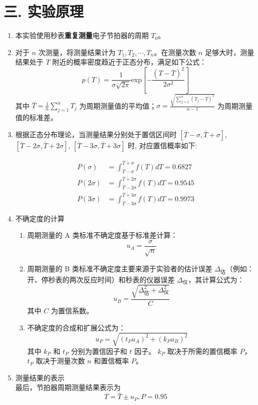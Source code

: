 \documentclass[12pt,a4paper]{article}
\begin{document}
	\section*{\textbf{{三. 实验原理}}}
	\begin{enumerate}
		\item 本实验使用秒表\textbf{重复测量}电子节拍器的周期 $T_0$。
		\item 对于 $n$ 次测量，将测量结果计为 $T_1,T_2,\cdots,T_n$。在测量次数 $n$ 足够大时，测量结果处于 $T$ 附近的概率密度趋近于正态分布，满足如下公式：
		$$p(T)=\dfrac{1}{\sigma\sqrt{2\pi}}\mathrm{exp}[-\dfrac{(T-\bar{T})^2}{2\sigma^2}]$$
		其中 $\bar{T}=\frac{1}{n}\sum_{j=1}^{n}T_j$ 为周期测量值的平均值；$\sigma=\frac{\sqrt{\sum_{j=1}^{n}(T_j-\bar{T})^2}}{n-1}$ 为周期测量值的标准差。
		\item 根据正态分布理论，当测量结果分别处于置信区间时 $[\overline{T}-\sigma, \overline{T}+\sigma]$, $[\overline{T}-2\sigma, \overline{T}+2\sigma]$, $[\overline{T}-3\sigma, \overline{T}+3\sigma]$ 时, 对应置信概率如下:

        \begin{align*}
            P(\sigma)&=\int_{\overline{T}-\sigma}^{\overline{T}+\sigma}f(T)dT=0.6827 \\
            P(2\sigma)&=\int_{\overline{T}-2\sigma}^{\overline{T}+2\sigma}f(T)dT=0.9545 \\
            P(3\sigma)&=\int_{\overline{T}-3\sigma}^{\overline{T}+3\sigma}f(T)dT=0.9973
        \end{align*}
	
		\item 不确定度的计算
		\begin{enumerate}
			\item 周期测量的 A 类标准不确定度基于标准差计算：
			$$u_A=\frac{\sigma}{\sqrt{n}}$$
		
			\item 周期测量的 B 类标准不确定度主要来源于实验者的估计误差 $\Delta_{\text{估}}$（例如：开、停秒表的两次反应时间）和秒表的仪器误差 $\Delta_{\text{仪}}$，其计算公式为：
			$$u_B=\dfrac{\sqrt{\Delta_{\text{估}}^2+\Delta_{\text{仪}}^2}}{C}$$
			其中 $C$ 为置信系数。
			\item 不确定度的合成和扩展公式为：
			$$u_P=\sqrt{(t_Pu_A)^2+(k_Pu_B)^2}$$
			其中 $k_{P}$ 和 $t_{P}$ 分别为置信因子和 $t$ 因子。 $k_{P}$ 取决于所需的置信概率 $P$，$t_{P}$ 取决于测量次数 $n$ 和置信概率 $P$。 
		\end{enumerate}
		\item 测量结果的表示
		\\最后，节拍器周期测量结果表示为\[T=\bar{T}\pm u_P,P=0.95\]
	\end{enumerate}
	
\end{document}
